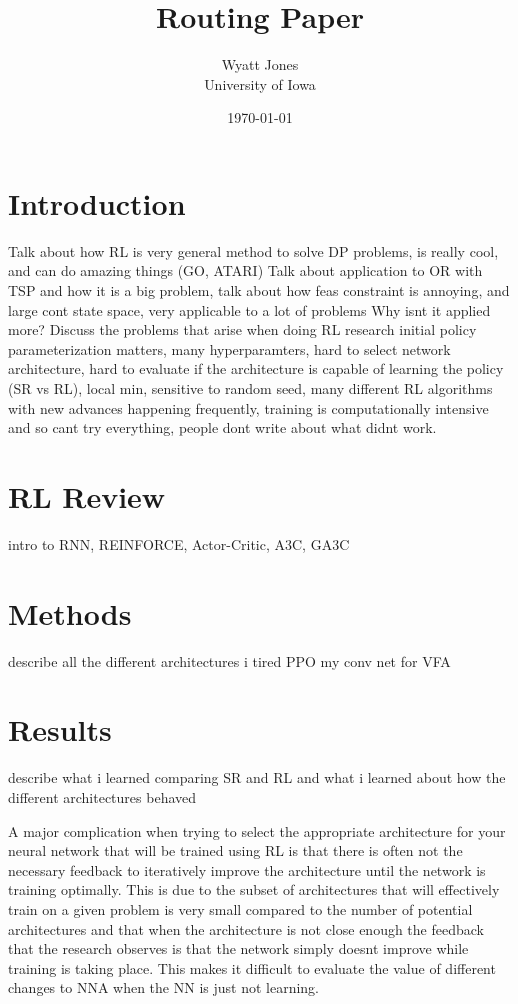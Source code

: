 \documentclass[12pt]{article}
\title{Routing Paper}
\author{Wyatt Jones\\University of Iowa}
\date{\today}
\begin{document}
\maketitle


\section{Introduction}
\label{intro}

Talk about how RL is very general method to solve DP problems, is really cool, and can do amazing things (GO, ATARI)
Talk about application to OR with TSP and how it is a big problem, talk about how feas constraint is annoying, and large cont state space, very applicable to a lot of problems
Why isnt it applied more?
Discuss the problems that arise when doing RL research initial policy parameterization matters, many hyperparamters, hard to select network architecture, hard to evaluate if the architecture is capable of learning the policy (SR vs RL), local min, sensitive to random seed, many different RL algorithms with new advances happening frequently, training is computationally intensive and so cant try everything, people dont write about what didnt work.





\section{RL Review}
intro to RNN, REINFORCE, Actor-Critic, A3C, GA3C

\section{Methods}
describe all the different architectures i tired
PPO
my conv net for VFA


\section{Results}
describe what i learned comparing SR and RL and what i learned about how the different architectures behaved

A major complication when trying to select the appropriate architecture for your neural network that will be trained using RL is that there is often not the necessary feedback to iteratively improve the architecture until the network is training optimally. This is due to the subset of architectures that will effectively train on a given problem is very small compared to the number of potential architectures and that when the architecture is not close enough the feedback that the research observes is that the network simply doesnt improve while training is taking place. This makes it difficult to evaluate the value of different changes to NNA when the NN is just not learning.
\end{document}
